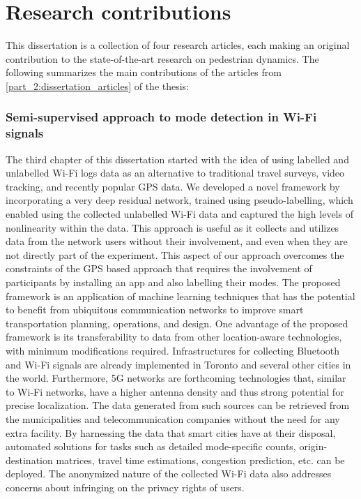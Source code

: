 \section{Research contributions}
\label{chap7:sec1}
This dissertation is a collection of four research articles, each making an original contribution to the state-of-the-art  research on pedestrian dynamics. The following summarizes the main contributions of the articles from \cref{part_2:dissertation_articles} of the thesis:

\subsubsection*{Semi-supervised approach to mode detection in Wi-Fi signals}
The third chapter of this dissertation started with the idea of using labelled and unlabelled Wi-Fi logs data as an alternative to traditional travel surveys, video tracking, and recently popular GPS data.
We developed a novel framework by incorporating a very deep residual network, trained using pseudo-labelling, which enabled using the collected unlabelled Wi-Fi data and captured the high levels of nonlinearity within the data.
This approach is useful as it collects and utilizes data from the network users without their involvement, and even when they are not directly part of the experiment. This aspect of our approach overcomes the constraints of the GPS based approach that requires the involvement of participants by installing an app and also labelling their modes.
The proposed framework is an application of machine learning techniques that has the potential to benefit from ubiquitous communication networks to improve smart transportation planning, operations, and design. One advantage of the proposed framework is its transferability to data from other location-aware technologies, with minimum modifications required. 
Infrastructures for collecting Bluetooth and Wi-Fi signals are already implemented in Toronto and several other cities in the world. Furthermore, 5G networks are forthcoming technologies that, similar to Wi-Fi networks, have a higher antenna density and thus strong potential for precise localization. The data generated from such sources can be retrieved from the municipalities and telecommunication companies without the need for any extra facility. By harnessing the data that smart cities have at their disposal, automated solutions for tasks such as detailed mode-specific counts, origin-destination matrices, travel time estimations, congestion prediction, etc. can be deployed. The anonymized nature of the collected Wi-Fi data also addresses concerns about infringing on the privacy rights of users. 


